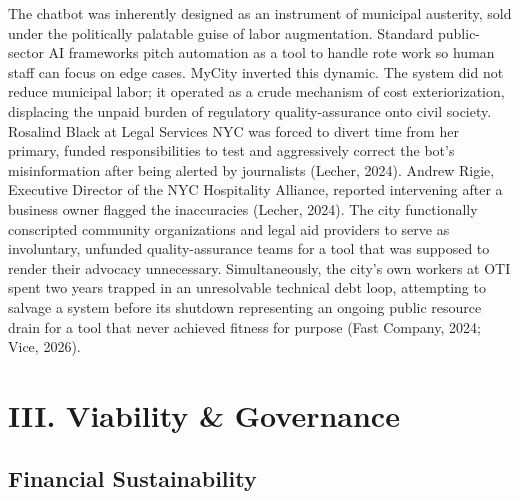 \documentclass[10pt, twocolumn]{article}
\begin{document}
The chatbot was inherently designed as an instrument of municipal austerity, sold under the politically palatable guise of labor augmentation. Standard public-sector AI frameworks pitch automation as a tool to handle rote work so human staff can focus on edge cases. MyCity inverted this dynamic. The system did not reduce municipal labor; it operated as a crude mechanism of cost exteriorization, displacing the unpaid burden of regulatory quality-assurance onto civil society. Rosalind Black at Legal Services NYC was forced to divert time from her primary, funded responsibilities to test and aggressively correct the bot's misinformation after being alerted by journalists (Lecher, 2024). Andrew Rigie, Executive Director of the NYC Hospitality Alliance, reported intervening after a business owner flagged the inaccuracies (Lecher, 2024). The city functionally conscripted community organizations and legal aid providers to serve as involuntary, unfunded quality-assurance teams for a tool that was supposed to render their advocacy unnecessary. Simultaneously, the city's own workers at OTI spent two years trapped in an unresolvable technical debt loop, attempting to salvage a system before its shutdown representing an ongoing public resource drain for a tool that never achieved fitness for purpose (Fast Company, 2024; Vice, 2026).

\section*{III. Viability \& Governance}

\subsection*{Financial Sustainability}
\end{document}
